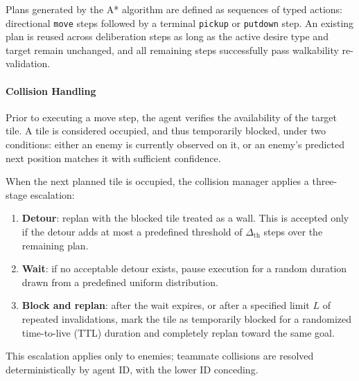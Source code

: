 Plans generated by the A* algorithm are defined as sequences of typed actions: directional \texttt{move} steps followed by a terminal \texttt{pickup} or \texttt{putdown} step.
An existing plan is reused across deliberation steps as long as the active desire type and target remain unchanged, and all remaining steps successfully pass walkability re-validation.

\paragraph{Collision Handling}
Prior to executing a move step, the agent verifies the availability of the target tile. A tile is considered occupied, and thus temporarily blocked, under two conditions:
either an enemy is currently observed on it, or an enemy's predicted next position matches it with sufficient confidence.

When the next planned tile is occupied, the collision manager applies a three-stage escalation:
\begin{enumerate}[noitemsep]
  \item \textbf{Detour}: replan with the blocked tile treated as a wall.
  This is accepted only if the detour adds at most a predefined threshold of $\Delta_\text{th}$ steps over the remaining plan.
  \item \textbf{Wait}: if no acceptable detour exists, pause execution for a random duration drawn from a predefined uniform distribution.
  \item \textbf{Block and replan}: after the wait expires, or after a specified limit $L$ of repeated invalidations,
  mark the tile as temporarily blocked for a randomized time-to-live (TTL) duration and completely replan toward the same goal.
\end{enumerate}

This escalation applies only to enemies; teammate collisions are resolved deterministically by agent ID, with the lower ID conceding.